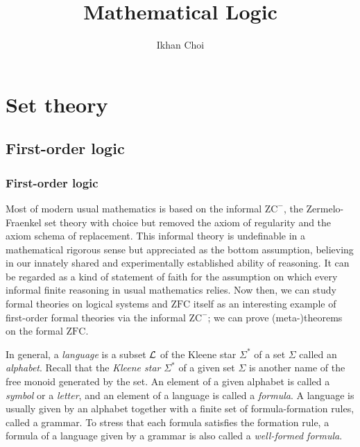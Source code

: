 \documentclass{../../large}
\begin{document}
\title{Mathematical Logic}
\author{Ikhan Choi}
\maketitle
\tableofcontents


\part{Set theory}
\chapter{First-order logic}
\section{First-order logic}
\begin{prb}
Most of modern usual mathematics is based on the informal $\mathrm{ZC}^-$, the Zermelo-Fraenkel set theory with choice but removed the axiom of regularity and the axiom schema of replacement.
This informal theory is undefinable in a mathematical rigorous sense but appreciated as the bottom assumption, believing in our innately shared and experimentally established ability of reasoning.
It can be regarded as a kind of statement of faith for the assumption on which every informal finite reasoning in usual mathematics relies.
Now then, we can study formal theories on logical systems and $\mathrm{ZFC}$ itself as an interesting example of first-order formal theories via the informal $\mathrm{ZC^-}$; we can prove (meta-)theorems on the formal $\mathrm{ZFC}$.
\end{prb}

\begin{prb}[Languages]
In general, a \emph{language} is a subset $\mathcal{L}$ of the Kleene star $\Sigma^*$ of a set $\Sigma$ called an \emph{alphabet}.
Recall that the \emph{Kleene star} $\Sigma^*$ of a given set $\Sigma$ is another name of the free monoid generated by the set.
An element of a given alphabet is called a \emph{symbol} or a \emph{letter}, and an element of a language is called a \emph{formula}.
A language is usually given by an alphabet together with a finite set of formula-formation rules, called a grammar.
To stress that each formula satisfies the formation rule, a formula of a language given by a grammar is also called a \emph{well-formed formula}.
\end{prb}
\end{document}
